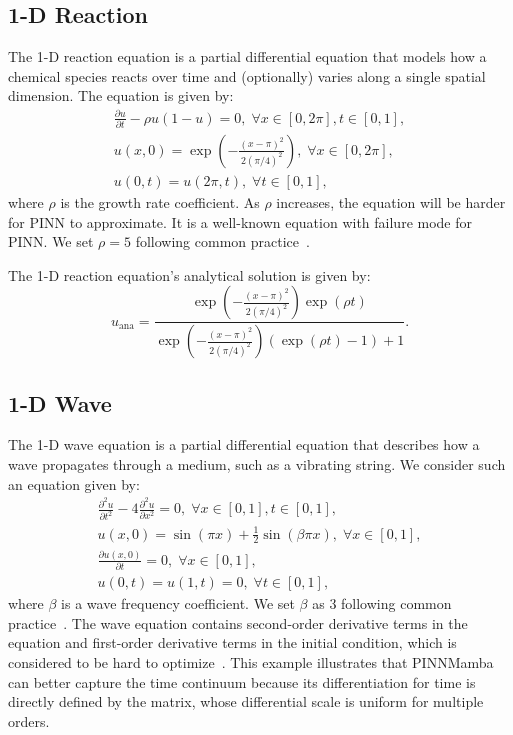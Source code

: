 \subsection{1-D Reaction}

The 1-D reaction equation is a partial differential equation that models how a chemical species reacts over time and (optionally) varies along a single spatial dimension. The equation is given by:
\begin{gather}
    \frac{\partial u}{\partial t} -\rho u(1-u) = 0,\; \forall x \in[0,2\pi], t\in [0,1],\nonumber\\
    u(x,0) = \exp(-\frac{(x-\pi)^2}{2(\pi/4)^2}),\;\forall x \in[0,2\pi],\\
    u(0,t)=u(2\pi,t),\; \forall  t\in [0,1],\nonumber
\end{gather}
where $\rho$ is the growth rate coefficient. As $\rho$ increases, the equation will be harder for PINN to approximate. It is a well-known equation with failure mode for PINN. We set $\rho=5$ following common practice~\cite{zhao2024pinnsformer,wu2024ropinn}.

The 1-D reaction equation's analytical solution is given by:
\begin{equation}
    u_\text{ana}=\frac{\exp(-\frac{(x-\pi)^2}{2(\pi/4)^2})\exp(\rho t)}{\exp(-\frac{(x-\pi)^2}{2(\pi/4)^2})(\exp(\rho t)-1)+1}.
\end{equation}

\subsection{1-D Wave}

The 1-D wave equation is a partial differential equation that describes how a wave propagates through a medium, such as a vibrating string.  We consider such an equation given by:
\begin{gather}
    \frac{\partial^2 u}{\partial t^2} - 4\frac{\partial^2 u}{\partial x^2} = 0,\; \forall x \in[0,1], t\in [0,1],\nonumber\\
    u(x,0) = \sin(\pi x)+\frac{1}{2}\sin(\beta \pi x), \;\forall x\in[0,1],\\
    \frac{\partial u(x,0)}{\partial t} = 0, \;\forall x\in[0,1],\nonumber\\
    u(0,t)=u(1,t) = 0, \; \forall  t\in [0,1],\nonumber
\end{gather}
where $\beta$ is a wave frequency coefficient. We set $\beta$ as 3 following common practice~\cite{zhao2024pinnsformer,wu2024ropinn}. The wave equation contains second-order derivative terms in the equation and first-order derivative terms in the initial condition, which is considered to be hard to optimize~\cite{wu2024ropinn}. This example illustrates that PINNMamba can better capture the time continuum because its differentiation for time is directly defined by the matrix, whose differential scale is uniform for multiple orders.

